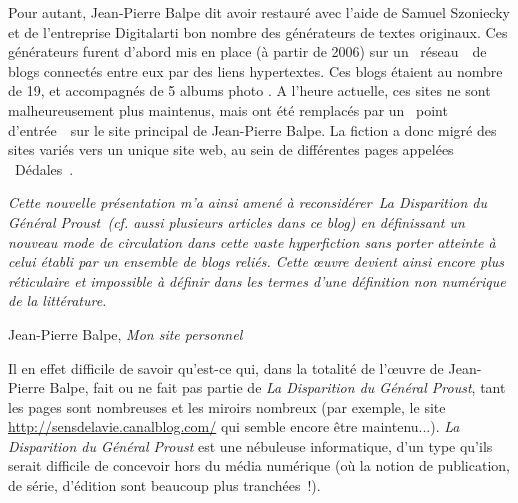 \documentclass{article}
\newenvironment{citationbox}
{\begin{center}
		\begin{minipage}{.8\textwidth}
		}
		{
		\end{minipage}	
\end{center}
}
\begin{document}
					Pour autant, Jean-Pierre Balpe dit avoir restauré avec l'aide de Samuel Szoniecky et de l'entreprise Digitalarti bon nombre des générateurs de textes originaux. Ces générateurs furent d'abord mis en place (à partir de 2006) sur un \guillemotleft~réseau~\guillemotright~de blogs connectés entre eux par des liens hypertextes. Ces blogs étaient au nombre de 19, et accompagnés de 5 albums photo \autocite{bordeleau2009}. A l'heure actuelle, ces sites ne sont malheureusement plus maintenus, mais ont été remplacés par un \guillemotleft~point d'entrée~\guillemotright~sur le site principal de Jean-Pierre Balpe. La fiction a donc migré des sites variés vers un unique site web, au sein de différentes pages appelées \guillemotleft~Dédales~\guillemotright.
					\begin{citationbox}
						\textit{Cette nouvelle présentation m'a ainsi amené à reconsidérer La Disparition du Général Proust (cf. aussi plusieurs articles dans ce blog) en définissant un nouveau mode de circulation dans cette vaste hyperfiction sans porter atteinte à celui établi par un ensemble de blogs reliés. Cette œuvre devient ainsi encore plus réticulaire et impossible à définir dans les termes d'une définition non numérique de la littérature.}\begin{flushright}
							Jean-Pierre Balpe, \textit{Mon site personnel}\autocite{balpe_blog}
						\end{flushright}
					\end{citationbox}
					Il en effet difficile de savoir qu'est-ce qui, dans la totalité de l'œuvre de Jean-Pierre Balpe, fait ou ne fait pas partie de \textit{La Disparition du Général Proust}, tant les pages sont nombreuses et les miroirs nombreux (par exemple, le site \href{http://sensdelavie.canalblog.com/}{http://sensdelavie.canalblog.com/} qui semble encore être maintenu...). \textit{La Disparition du Général Proust} est une nébuleuse informatique, d'un type qu'ils serait difficile de concevoir hors du média numérique (où la notion de publication, de série, d'édition sont beaucoup plus tranchées~!).\\
					
\end{document}
